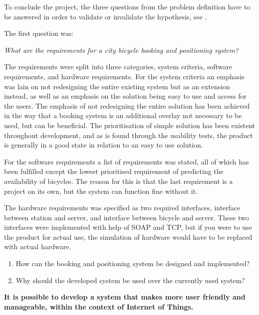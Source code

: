 To conclude the project, the three questions from the problem definition have to be answered in order to validate or invalidate the hypothesis, see .

The first question was:
\begin{center}
	\textit{What are the requirements for a city bicycle booking and positioning system?}
\end{center}
The requirements were split into three categories, system criteria, software requirements, and hardware requirements.
For the system criteria an emphasis was lain on not redesigning the entire existing system but as an extension instead, as well as an emphasis on the solution being easy to use and access for the users.
The emphasis of not redesigning the entire solution has been achieved in the way that a booking system is an additional overlay not necessary to be used, but can be beneficial.
The prioritisation of simple solution has been existent throughout development, and as is found through the usability tests, the product is generally in a good state in relation to an easy to use solution.

For the software requirements a list of requirements was stated, all of which has been fulfilled except the lowest prioritised requirement of predicting the availability of bicycles. The reason for this is that the last requirement is a project on its own, but the system can function fine without it.

The hardware requirements was specified as two required interfaces, interface between station and server, and interface between bicycle and server.
These two interfaces were implemented with help of SOAP and TCP, but if you were to use the product for actual use, the simulation of hardware would have to be replaced with actual hardware.

\begin{enumerate}
	\item How can the booking and positioning system be designed and implemented?
	\item Why should the developed system be used over the currently used system?
\end{enumerate}


\begin{center}
	\textbf{It is possible to develop a system that makes \bycykel more user friendly and manageable, within the context of Internet of Things.}
\end{center}
